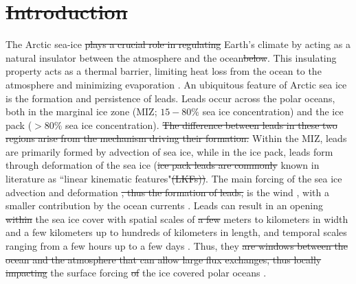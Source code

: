 \documentclass[lineno,sn-basic]{sn-jnl}%
\providecommand{\DIFadd}[1]{{\protect\color{blue}\uwave{#1}}} %
\providecommand{\DIFdel}[1]{{\protect\color{red}\sout{#1}}}                      %
\providecommand{\DIFaddbegin}{} %
\providecommand{\DIFaddend}{} %
\providecommand{\DIFdelbegin}{} %
\providecommand{\DIFdelend}{} %
\newcommand{\DIFscaledelfig}{0.5}
\newlength{\DIFdelgraphicswidth} %
\newlength{\DIFdelgraphicsheight} %
\newcommand{\DIFaddincludegraphics}[2][]{{\color{blue}\fbox{\DIFOincludegraphics[#1]{#2}}}} %
\newcommand{\DIFdelincludegraphics}[2][]{%
\sbox{\DIFdelgraphicsbox}{\DIFOincludegraphics[#1]{#2}}%
\settoboxwidth{\DIFdelgraphicswidth}{\DIFdelgraphicsbox} %
\settoboxtotalheight{\DIFdelgraphicsheight}{\DIFdelgraphicsbox} %
\scalebox{\DIFscaledelfig}{%
\parbox[b]{\DIFdelgraphicswidth}{\usebox{\DIFdelgraphicsbox}\\[-\baselineskip] \rule{\DIFdelgraphicswidth}{0em}}\llap{\resizebox{\DIFdelgraphicswidth}{\DIFdelgraphicsheight}{%
\setlength{\unitlength}{\DIFdelgraphicswidth}%
\begin{picture}(1,1)%
\thicklines\linethickness{2pt} %
{\color[rgb]{1,0,0}\put(0,0){\framebox(1,1){}}}%
{\color[rgb]{1,0,0}\put(0,0){\line( 1,1){1}}}%
{\color[rgb]{1,0,0}\put(0,1){\line(1,-1){1}}}%
\end{picture}%
}\hspace*{3pt}}} %
} %
\DeclareRobustCommand{\DIFaddbegin}{\DIFOaddbegin \let\includegraphics\DIFaddincludegraphics} %
\DeclareRobustCommand{\DIFaddend}{\DIFOaddend \let\includegraphics\DIFOincludegraphics} %
\DeclareRobustCommand{\DIFdelbegin}{\DIFOdelbegin \let\includegraphics\DIFdelincludegraphics} %
\DeclareRobustCommand{\DIFdelend}{\DIFOaddend \let\includegraphics\DIFOincludegraphics} %
\begin{document}


\maketitle

\DIFdelbegin \section{\DIFdel{Introduction}}%
\addtocounter{section}{-1}%
\DIFdelend %

The Arctic sea-ice \DIFdelbegin \DIFdel{plays a crucial role in regulating }\DIFdelend \DIFaddbegin \DIFadd{regulates }\DIFaddend Earth's climate by acting as a natural insulator between the atmosphere and the ocean\DIFdelbegin \DIFdel{below}\DIFdelend . This insulating property acts as a thermal barrier, limiting heat loss from the ocean to the atmosphere and minimizing evaporation \citep{Wettlaufer_insulator_1997, Untersteiner_ice_insulator_1961}. An ubiquitous feature of Arctic sea ice is the formation and persistence of leads. Leads occur across the polar oceans, both in the marginal ice zone (MIZ; $15-80\%$ sea ice concentration) and the ice pack ($>80\%$ sea ice concentration). \DIFdelbegin \DIFdel{The difference between leads in these two regions arise from the mechanism driving their formation. }\DIFdelend Within the MIZ, leads are primarily formed by advection of sea ice, while in the ice pack, leads form through deformation of the sea ice (\DIFdelbegin \DIFdel{ice pack leads are commonly }\DIFdelend known in literature as ``linear kinematic features"\DIFdelbegin \DIFdel{(LKFs))}\DIFdelend \DIFaddbegin \DIFadd{; LKFs)}\DIFaddend . 
The main forcing of the sea ice advection and deformation \DIFdelbegin \DIFdel{, thus the formation of leads, }\DIFdelend is the wind \citep{Linow_lkf_2017, Hutter_scaling_lkf_2018}, with a smaller contribution by the ocean currents \citep{Willmes_leads_currents_2023}.
Leads can result in an opening \DIFdelbegin \DIFdel{within }\DIFdelend \DIFaddbegin \DIFadd{of }\DIFaddend the sea ice cover \citep{Rampal_nextsim_2016, Hutchings_model_lkf_2005, Richter_pack_stress_2002} with spatial scales of \DIFdelbegin \DIFdel{a few }\DIFdelend meters to kilometers in width and a few kilometers up to hundreds of kilometers in length, and temporal scales ranging from a few hours up to a few days \citep{Linow_lkf_2017, Wernecke_Lead_2015, Tschudi_obs_leads_1998}. Thus, they \DIFdelbegin \DIFdel{are windows between the ocean and the atmosphere that can allow large flux exchanges, thus locally impacting }\DIFdelend \DIFaddbegin \DIFadd{can locally impact }\DIFaddend the surface forcing \DIFdelbegin \DIFdel{of }\DIFdelend \DIFaddbegin \DIFadd{in }\DIFaddend the ice covered polar oceans \citep{Lupkes_leads_2008}.
\end{document}
